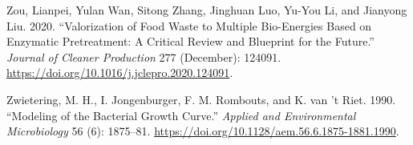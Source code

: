 \documentclass[11pt]{report}
\begin{document}
\begin{hangparas}{1.5em}{1}
\hypertarget{citeproc_bib_item_106}{Zou, Lianpei, Yulan Wan, Sitong Zhang, Jinghuan Luo, Yu-You Li, and Jianyong Liu. 2020. “Valorization of Food Waste to Multiple Bio-Energies Based on Enzymatic Pretreatment: A Critical Review and Blueprint for the Future.” \textit{Journal of Cleaner Production} 277 (December): 124091. \url{https://doi.org/10.1016/j.jclepro.2020.124091}.}

\hypertarget{citeproc_bib_item_107}{Zwietering, M. H., I. Jongenburger, F. M. Rombouts, and K. van ’t Riet. 1990. “Modeling of the Bacterial Growth Curve.” \textit{Applied and Environmental Microbiology} 56 (6): 1875–81. \url{https://doi.org/10.1128/aem.56.6.1875-1881.1990}.}\bigskip
\end{hangparas}
\end{document}
